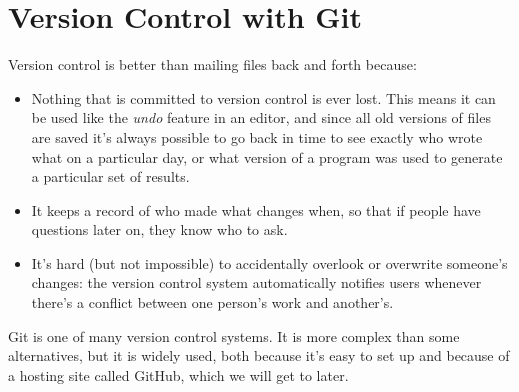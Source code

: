 \documentclass{article}
\begin{document}
\newpage
\section{Version Control with Git}

Version control is better than mailing files back and forth because:
\begin{itemize}
\item
Nothing that is committed to version control is ever lost. This means it can be used like the \emph{undo} feature in an editor, and since all old versions of files are saved it's always possible to go back in time to see exactly who wrote what on a particular day, or what version of a program was used to generate a particular set of results.
\item
It keeps a record of who made what changes when, so that if people have questions later on, they know who to ask.
\item
It's hard (but not impossible) to accidentally overlook or overwrite someone's changes: the version control system automatically notifies users whenever there's a conflict between one person's work and another's.
\end{itemize}
Git is one of many version control systems. It is more complex than some alternatives, but it is widely used, both because it's easy to set up and because of a hosting site called GitHub, which we will get to later.
\end{document}
